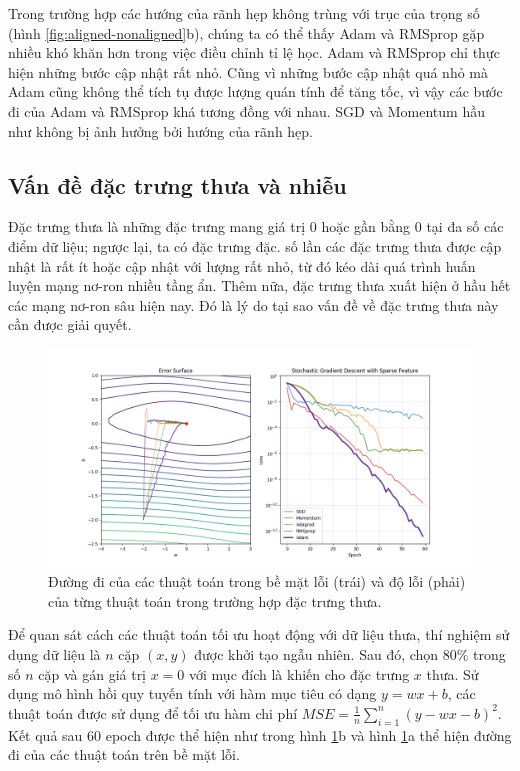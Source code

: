 Trong trường hợp các hướng của rãnh hẹp không trùng với trục của trọng số (hình \ref{fig:aligned-nonaligned}b), chúng ta có thể thấy Adam và RMSprop gặp nhiều khó khăn hơn trong việc điều chỉnh tỉ lệ học. Adam và RMSprop chỉ thực hiện những bước cập nhật rất nhỏ. Cũng vì những bước cập nhật quá nhỏ mà Adam cũng không thể tích tụ được lượng quán tính để tăng tốc, vì vậy các bước đi của Adam và RMSprop khá tương đồng với nhau. SGD và Momentum hầu như không bị ảnh hưởng bởi hướng của rãnh hẹp.

\subsection{Vấn đề đặc trưng thưa và nhiễu}
\label{exp:sparse-noisy}

Đặc trưng thưa là những đặc trưng mang giá trị 0 hoặc gần bằng 0 tại đa số các điểm dữ liệu; ngược lại, ta có đặc trưng đặc. số lần các đặc trưng thưa được cập nhật là rất ít hoặc cập nhật với lượng rất nhỏ, từ đó kéo dài quá trình huấn luyện mạng nơ-ron nhiều tầng ẩn. Thêm nữa, đặc trưng thưa xuất hiện ở hầu hết các mạng nơ-ron sâu hiện nay. Đó là lý do tại sao vấn đề về đặc trưng thưa này cần được giải quyết.

\begin{figure}[htp]
	\centering
	\includegraphics[width=140 mm]{images/sparse.png}
	\caption{Đường đi của các thuật toán trong bề mặt lỗi (trái) và độ lỗi (phải) của từng thuật toán trong trường hợp đặc trưng thưa.}
	\label{fig:sparse}
\end{figure}

Để quan sát cách các thuật toán tối ưu hoạt động với dữ liệu thưa, thí nghiệm sử dụng dữ liệu là $n$ cặp $(x,y)$ được khởi tạo ngẫu nhiên. Sau đó, chọn 80$\%$ trong số $n$ cặp và gán giá trị $x = 0$ với mục đích là khiến cho đặc trưng $x$ thưa. Sử dụng mô hình hồi quy tuyến tính với hàm mục tiêu có dạng $y = wx + b$, các thuật toán được sử dụng để tối ưu hàm chi phí $MSE = \frac{1}{n}\sum_{i=1}^n(y - wx - b)^2$. Kết quả sau 60 epoch được thể hiện như trong hình \ref{fig:sparse}b và hình \ref{fig:sparse}a thể hiện đường đi của các thuật toán trên bề mặt lỗi.

